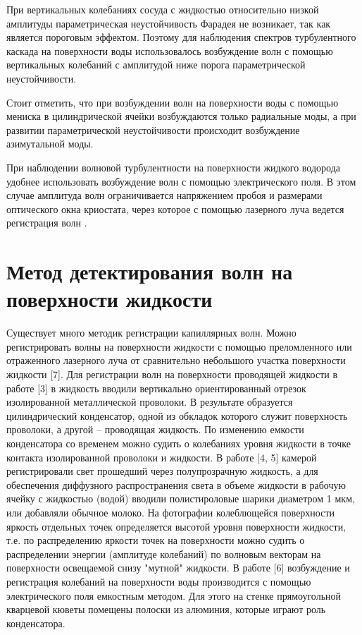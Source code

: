 При вертикальных колебаниях сосуда с жидкостью относительно низкой амплитуды параметрическая неустойчивость Фарадея не возникает, так как является пороговым эффектом. Поэтому для наблюдения спектров турбулентного каскада на поверхности воды использовалось возбуждение волн с помощью вертикальных колебаний с амплитудой ниже порога параметрической неустойчивости. 

Стоит отметить, что при возбуждении волн на поверхности воды с помощью мениска в цилиндрической ячейки возбуждаются только радиальные моды, а при развитии параметрической неустойчивости происходит возбуждение азимутальной моды.



При наблюдении волновой турбулентности на поверхности жидкого водорода удобнее использовать возбуждение волн с помощью электрического поля. В этом случае амплитуда волн ограничивается напряжением пробоя и размерами оптического окна криостата, через которое с помощью лазерного луча ведется регистрация волн \cite{Brazhnikov2002}.


\section{Метод детектирования волн на поверхности жидкости}\label{p1_methodDetect}

Существует много методик регистрации капиллярных волн. Можно регистрировать волны на поверхности жидкости с помощью преломленного или отраженного лазерного луча от сравнительно небольшого участка поверхности жидкости [7]. Для регистрации волн на поверхности проводящей жидкости в работе [3] в жидкость вводили вертикально ориентированный отрезок изолированной металлической проволоки. В результате образуется цилиндрический конденсатор, одной из обкладок которого служит поверхность проволоки, а другой – проводящая жидкость. По изменению емкости конденсатора со временем можно судить о колебаниях уровня жидкости в точке контакта изолированной проволоки и жидкости.
В работе [4, 5] камерой регистрировали свет прошедший через полупрозрачную жидкость, а для обеспечения диффузного распространения света в объеме жидкости в рабочую ячейку с жидкостью (водой) вводили полистироловые шарики диаметром 1 мкм, или добавляли обычное молоко. На фотографии колеблющейся поверхности яркость отдельных точек определяется высотой уровня поверхности жидкости, т.е. по распределению яркости точек на поверхности можно судить о распределении энергии (амплитуде колебаний) по волновым векторам на поверхности освещаемой снизу "мутной" жидкости. В работе [6] возбуждение и регистрация колебаний на поверхности воды производится с помощью электрического поля емкостным методом. Для этого на стенке прямоугольной кварцевой кюветы помещены полоски из алюминия, которые играют роль конденсатора.


